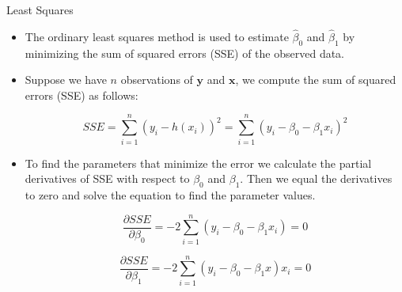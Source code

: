 \documentclass[handout]{beamer}
\begin{document}
\begin{frame}{Least Squares}
\scriptsize{
\begin{itemize}

 \item The ordinary least squares method is used to estimate  $\hat{\beta}_{0}$ and $\hat{\beta}_{1}$ by minimizing the sum of squared errors (SSE) of the observed data.

 \item Suppose we have $n$ observations of $\mathbf{y}$ and $\mathbf{x}$, we compute the sum of squared errors (SSE) as follows:

\begin{equation}
SSE = \sum_{i=1}^{n} (y_i-h(x_i))^2 =  \sum_{i=1}^{n} (y_i-\beta_{0}-\beta_{1}x_i)^2
\end{equation}

 \item To find the parameters that minimize the error we calculate the partial derivatives of SSE with respect to $\beta_{0}$ and $\beta_{1}$. Then we equal the derivatives to zero and solve the equation to find the parameter values.
 
 \begin{equation}
 \frac{\partial SSE}{ \partial \beta_0} = -2\sum_{i=1}^{n}(y_i-\beta_{0}-\beta_{1}x_i)=0
 \end{equation}

  \begin{equation}
 \frac{\partial SSE}{ \partial \beta_1} = -2\sum_{i=1}^{n}(y_i-\beta_{0}-\beta_{1}x)x_i=0
 \end{equation}



\end{itemize}



} 
\end{frame}
\end{document}
